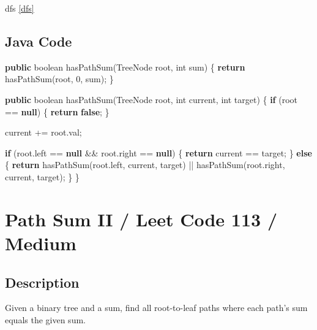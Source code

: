\documentclass[]{book}
\newenvironment{Shaded}{\begin{snugshade}}{\end{snugshade}}
\newcommand{\BuiltInTok}[1]{#1}
\newcommand{\DataTypeTok}[1]{\textcolor[rgb]{0.13,0.29,0.53}{#1}}
\newcommand{\DecValTok}[1]{\textcolor[rgb]{0.00,0.00,0.81}{#1}}
\newcommand{\FunctionTok}[1]{\textcolor[rgb]{0.00,0.00,0.00}{#1}}
\newcommand{\KeywordTok}[1]{\textcolor[rgb]{0.13,0.29,0.53}{\textbf{#1}}}
\newcommand{\NormalTok}[1]{#1}
\begin{document}
dfs \ref{dfs}

\hypertarget{java-code-45}{%
\subsection{Java Code}\label{java-code-45}}

\begin{Shaded}
\begin{Highlighting}[]
\KeywordTok{public} \DataTypeTok{boolean} \FunctionTok{hasPathSum}\NormalTok{(}\BuiltInTok{TreeNode}\NormalTok{ root, }\DataTypeTok{int}\NormalTok{ sum) \{}
    \KeywordTok{return} \FunctionTok{hasPathSum}\NormalTok{(root, }\DecValTok{0}\NormalTok{, sum);}
\NormalTok{\}}

\KeywordTok{public} \DataTypeTok{boolean} \FunctionTok{hasPathSum}\NormalTok{(}\BuiltInTok{TreeNode}\NormalTok{ root, }\DataTypeTok{int}\NormalTok{ current, }\DataTypeTok{int}\NormalTok{ target) \{}
    \KeywordTok{if}\NormalTok{ (root == }\KeywordTok{null}\NormalTok{) \{}
        \KeywordTok{return} \KeywordTok{false}\NormalTok{;}
\NormalTok{    \}}

\NormalTok{    current += root.}\FunctionTok{val}\NormalTok{;}

    \KeywordTok{if}\NormalTok{ (root.}\FunctionTok{left}\NormalTok{ == }\KeywordTok{null}\NormalTok{ && root.}\FunctionTok{right}\NormalTok{ == }\KeywordTok{null}\NormalTok{) \{}
        \KeywordTok{return}\NormalTok{ current == target;}
\NormalTok{    \} }\KeywordTok{else}\NormalTok{ \{}
        \KeywordTok{return} \FunctionTok{hasPathSum}\NormalTok{(root.}\FunctionTok{left}\NormalTok{, current, target) || }\FunctionTok{hasPathSum}\NormalTok{(root.}\FunctionTok{right}\NormalTok{, current, target);}
\NormalTok{    \}}
\NormalTok{\}}
\end{Highlighting}
\end{Shaded}

\hypertarget{path-sum-ii-leet-code-113-medium}{%
\section{Path Sum II / Leet Code 113 / Medium}\label{path-sum-ii-leet-code-113-medium}}

\hypertarget{description-60}{%
\subsection{Description}\label{description-60}}

Given a binary tree and a sum, find all root-to-leaf paths where each path's sum equals the given sum.
\end{document}
